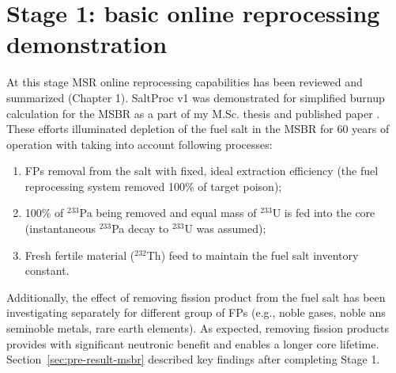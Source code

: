 \section{Stage 1: basic online reprocessing demonstration}
At this stage \gls{MSR} online reprocessing capabilities has been reviewed and 
summarized (Chapter 1). SaltProc v1 was demonstrated for simplified burnup 
calculation for the \gls{MSBR} as a part of my M.Sc. thesis 
\cite{rykhlevskii_advanced_2018} and published paper 
\cite{rykhlevskii_modeling_2019}. These efforts illuminated depletion of the 
fuel salt in the \gls{MSBR} for 60 years of operation with taking into account 
following processes:
\begin{enumerate}
	\item \glspl{FP} removal from the salt with fixed, ideal extraction 
	efficiency (the fuel reprocessing system removed 100\% of target poison);
	\item 100\% of $^{233}$Pa being removed and equal mass of $^{233}$U is fed 
	into the core (instantaneous $^{233}$Pa decay to $^{233}$U was assumed);
	\item Fresh fertile material ($^{232}$Th) feed to maintain the fuel salt 
	inventory constant.
\end{enumerate}
Additionally, the effect of removing fission product from the fuel salt has 
been investigating separately for different group of \glspl{FP} (e.g., noble 
gases, noble ans seminoble metals, rare earth elements). As expected, removing 
fission products provides with significant neutronic benefit and enables a 
longer core lifetime. Section~\ref{sec:pre-result-msbr} described key findings 
after completing Stage 1.

